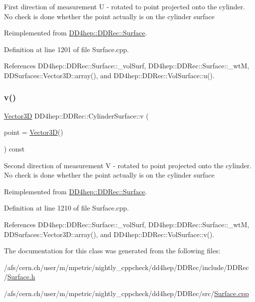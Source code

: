 First direction of measurement U -\/ rotated to point projected onto the cylinder. No check is done whether the point actually is on the cylinder surface 

Reimplemented from \hyperlink{class_d_d4hep_1_1_d_d_rec_1_1_surface_a1b69829495d4a43178222cc7a5b369da}{D\+D4hep\+::\+D\+D\+Rec\+::\+Surface}.



Definition at line 1201 of file Surface.\+cpp.



References D\+D4hep\+::\+D\+D\+Rec\+::\+Surface\+::\+\_\+vol\+Surf, D\+D4hep\+::\+D\+D\+Rec\+::\+Surface\+::\+\_\+wtM, D\+D\+Surfaces\+::\+Vector3\+D\+::array(), and D\+D4hep\+::\+D\+D\+Rec\+::\+Vol\+Surface\+::u().

\hypertarget{class_d_d4hep_1_1_d_d_rec_1_1_cylinder_surface_a53dbbe89c9d1306d5cafb5a940b8d77f}{}\label{class_d_d4hep_1_1_d_d_rec_1_1_cylinder_surface_a53dbbe89c9d1306d5cafb5a940b8d77f} 
\subsubsection{\texorpdfstring{v()}{v()}}
{\footnotesize\ttfamily \hyperlink{class_d_d_surfaces_1_1_vector3_d}{Vector3D} D\+D4hep\+::\+D\+D\+Rec\+::\+Cylinder\+Surface\+::v (\begin{DoxyParamCaption}\item[{const \hyperlink{class_d_d_surfaces_1_1_vector3_d}{Vector3D} \&}]{point = {\ttfamily \hyperlink{class_d_d_surfaces_1_1_vector3_d}{Vector3D}()} }\end{DoxyParamCaption}) const\hspace{0.3cm}{\ttfamily [virtual]}}

Second direction of measurement V -\/ rotated to point projected onto the cylinder. No check is done whether the point actually is on the cylinder surface 

Reimplemented from \hyperlink{class_d_d4hep_1_1_d_d_rec_1_1_surface_ab2ff33cf97a5d3b516673b31867dd035}{D\+D4hep\+::\+D\+D\+Rec\+::\+Surface}.



Definition at line 1210 of file Surface.\+cpp.



References D\+D4hep\+::\+D\+D\+Rec\+::\+Surface\+::\+\_\+vol\+Surf, D\+D4hep\+::\+D\+D\+Rec\+::\+Surface\+::\+\_\+wtM, D\+D\+Surfaces\+::\+Vector3\+D\+::array(), and D\+D4hep\+::\+D\+D\+Rec\+::\+Vol\+Surface\+::v().



The documentation for this class was generated from the following files\+:\begin{DoxyCompactItemize}
\item 
/afs/cern.\+ch/user/m/mpetric/nightly\+\_\+cppcheck/dd4hep/\+D\+D\+Rec/include/\+D\+D\+Rec/\hyperlink{_surface_8h}{Surface.\+h}\item 
/afs/cern.\+ch/user/m/mpetric/nightly\+\_\+cppcheck/dd4hep/\+D\+D\+Rec/src/\hyperlink{_surface_8cpp}{Surface.\+cpp}\end{DoxyCompactItemize}

